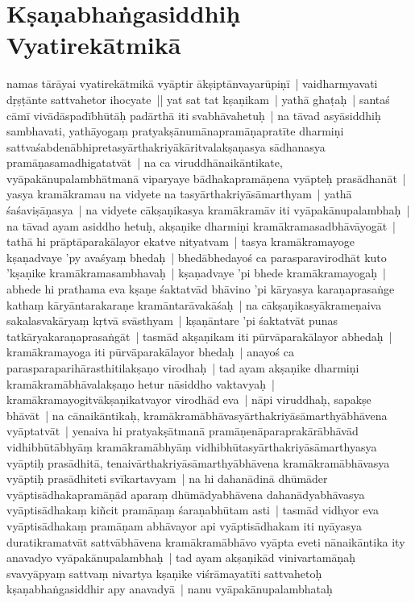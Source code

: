 \documentclass[article,12pt,a4paper]{memoir}
\begin{document}
	
	  
	
\chapter[{Kṣaṇabhaṅgasiddhiḥ Vyatirekātmikā}]{Kṣaṇabhaṅgasiddhiḥ Vyatirekātmikā}\label{Kṣaṇabhaṅgasiddhiḥ_Vyatirekātmikā}

	  \pstart namas tārāyai \label{thakur75-83.6} vyatirekātmikā vyāptir ākṣiptānvayarūpiṇī | vaidharmyavati dṛṣṭānte sattvahetor ihocyate || \label{thakur75-83.8} yat sat tat kṣaṇikam | yathā ghaṭaḥ | santaś cāmī vivādāspadībhūtāḥ padārthā iti svabhāvahetuḥ | \label{thakur75-83.10} na tāvad asyāsiddhiḥ sambhavati, yathāyogaṃ pratyakṣānumānapramāṇapratīte dharmiṇi sattvaśabdenābhipretasyārthakriyākāritvalakṣaṇasya sādhanasya pramāṇasamadhigatatvāt | \label{thakur75-83.12} na ca viruddhānaikāntikate, vyāpakānupalambhātmanā viparyaye bādhakapramāṇena vyāpteḥ prasādhanāt | \label{thakur75-83.13} yasya kramākramau na vidyete na tasyārthakriyāsāmarthyam | yathā śaśaviṣāṇasya | na vidyete cākṣaṇikasya kramākramāv iti vyāpakānupalambhaḥ | \label{thakur75-83.14} na tāvad ayam asiddho hetuḥ, akṣaṇike dharmiṇi kramākramasadbhāvāyogāt | tathā hi prāptāparakālayor ekatve nityatvam | tasya kramākramayoge kṣaṇadvaye 'py avaśyaṃ bhedaḥ | bhedābhedayoś ca parasparavirodhāt kuto 'kṣaṇike kramākramasambhavaḥ | kṣaṇadvaye 'pi bhede kramākramayogaḥ | abhede hi prathama eva kṣaṇe śaktatvād bhāvino 'pi kāryasya karaṇaprasaṅge kathaṃ kāryāntarakaraṇe kramāntarāvakāśaḥ | na cākṣaṇikasyākrameṇaiva sakalasvakāryaṃ kṛtvā svāsthyam | kṣaṇāntare 'pi śaktatvāt punas tatkāryakaraṇaprasaṅgāt | \label{thakur75-83.21} tasmād akṣaṇikam iti pūrvāparakālayor abhedaḥ | kramākramayoga iti pūrvāparakālayor bhedaḥ | anayoś ca parasparaparihārasthitilakṣaṇo virodhaḥ | \label{thakur75-83.23} tad ayam akṣaṇike dharmiṇi kramākramābhāvalakṣaṇo hetur nāsiddho vaktavyaḥ | kramākramayogitvākṣaṇikatvayor virodhād eva | \label{thakur75-84.1} nāpi viruddhaḥ, sapakṣe bhāvāt | \label{thakur75-84.2} na cānaikāntikaḥ, kramākramābhāvasyārthakriyāsāmarthyābhāvena vyāptatvāt | \label{thakur75-84.3} yenaiva hi pratyakṣātmanā pramāṇenāparaprakārābhāvād vidhibhūtābhyāṃ kramākramābhyāṃ vidhibhūtasyārthakriyāsāmarthyasya vyāptiḥ prasādhitā, tenaivārthakriyāsāmarthyābhāvena kramākramābhāvasya vyāptiḥ prasādhiteti svīkartavyam | na hi dahanādinā dhūmāder vyāptisādhakapramāṇād aparaṃ dhūmādyabhāvena dahanādyabhāvasya vyāptisādhakaṃ kiñcit pramāṇaṃ śaraṇabhūtam asti | tasmād vidhyor eva vyāptisādhakaṃ pramāṇam abhāvayor api vyāptisādhakam iti nyāyasya duratikramatvāt sattvābhāvena kramākramābhāvo vyāpta eveti nānaikāntika ity anavadyo vyāpakānupalambhaḥ | tad ayam akṣaṇikād vinivartamāṇaḥ svavyāpyaṃ sattvaṃ nivartya kṣaṇike viśrāmayatīti sattvahetoḥ kṣaṇabhaṅgasiddhir apy anavadyā | \label{thakur75-85.1} nanu vyāpakānupalambhataḥ 
\end{document}
